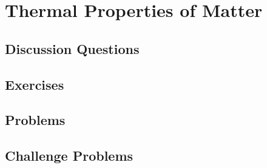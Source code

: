
\chapter{Thermal Properties of Matter}

\section{Discussion Questions}

\section{Exercises}

\section{Problems}

\section{Challenge Problems}
